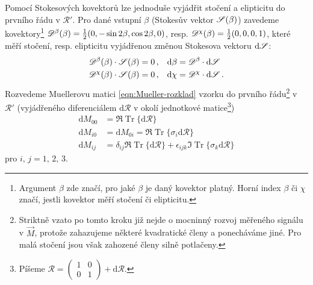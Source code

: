 Pomocí Stokesových kovektorů lze jednoduše vyjádřit stočení a elipticitu do prvního řádu v $\mathcal{R}'$.
Pro dané vstupní $\beta$ (Stokesův vektor $\mathscr{S}(\beta)$) zavedeme kovektory\footnote{Argument $\beta$ zde značí, pro jaké $\beta$ je daný kovektor platný. Horní index $\beta$ či $\chi$ značí, jestli kovektor měří stočení či elipticitu.} $\mathscr{D}^\beta(\beta)=\frac{1}{2}(0, -\sin2\beta, \cos2\beta, 0)$, resp. $\mathscr{D}^\chi(\beta)=\frac{1}{2}(0, 0, 0, 1)$, které měří stočení, resp. elipticitu vyjádřenou změnou Stokesova vektoru $\textrm{d}\mathscr{S}$:
\begin{subequations}
\begin{align}
    \mathscr{D}^\beta(\beta) \cdot \mathscr{S}(\beta) &= 0 \,, &\textrm{d}\beta &= \mathscr{D}^\beta \cdot \textrm{d}\mathscr{S} \\
    \mathscr{D}^\chi(\beta) \cdot \mathscr{S}(\beta) &= 0 \,, & \textrm{d}\chi &= \mathscr{D}^\chi \cdot \textrm{d}\mathscr{S} \,.
\end{align}
\end{subequations}
Rozvedeme Muellerovu matici \eqref{eqn:Mueller-rozklad} vzorku do prvního řádu\footnote{Striktně vzato po tomto kroku již nejde o mocninný rozvoj měřeného signálu v $\vec{M}$, protože zahazujeme některé kvadratické členy a ponecháváme jiné.
Pro malá stočení jsou však zahozené členy silně potlačeny.} v $\mathcal{R}'$ (vyjádřeného diferenciálem $\textrm{d}\mathcal{R}$ v okolí jednotkové matice\footnote{Píšeme $\mathcal{R}= \begin{pmatrix} 1&0\\0&1 \end{pmatrix} + \textrm{d}\mathcal{R}$.}) 
\begin{subequations}
\label{eqn:dif-Mueller}
\begin{align}
    \textrm{d}M_{00} &= \Re \operatorname{Tr} \lbrace\textrm{d}\mathcal{R} \rbrace\\
    \textrm{d}M_{i0} &= \textrm{d}M_{0i} = \Re \operatorname{Tr} \lbrace \sigma_i \textrm{d}\mathcal{R} \rbrace \\
    \textrm{d}M_{ij} &= \delta_{ij} \Re\operatorname{Tr}\lbrace\textrm{d}\mathcal{R}\rbrace + \epsilon_{ijk} \Im\operatorname{Tr}\lbrace\sigma_k\textrm{d}\mathcal{R}\rbrace
\end{align}
\end{subequations}
pro $i,\,j = 1,\,2,\,3$.

